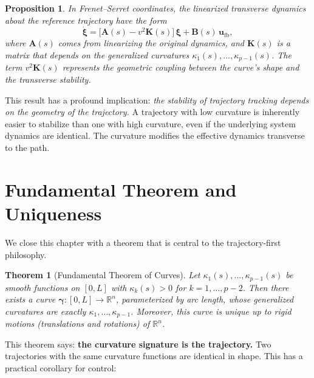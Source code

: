 \documentclass[12pt, openany]{book}
\theoremstyle{plain}
\newtheorem{proposition}{Proposition}[chapter]
\newtheorem{theorem}{Theorem}[chapter]
\newcommand{\control}{\bm{u}}
\newcommand{\traj}{\bm{\gamma}}
\newcommand{\Reals}{\mathbb{R}}
\begin{document}
\begin{proposition}\label{prop:curv_coupling}
  In Frenet--Serret coordinates, the linearized transverse dynamics about the
  reference trajectory have the form
  \begin{equation}\label{eq:transverse_lin}
    \dot{\bm{\xi}} = \bigl[\bm{A}(s) - v^2 \bm{K}(s)\bigr]\, \bm{\xi}
    + \bm{B}(s)\, \control_{\text{fb}},
  \end{equation}
  where $\bm{A}(s)$ comes from linearizing the original dynamics, and
  $\bm{K}(s)$ is a matrix that depends on the generalized curvatures
  $\kappa_1(s), \ldots, \kappa_{p-1}(s)$. The term $v^2\bm{K}(s)$ represents
  the geometric coupling between the curve's shape and the transverse stability.
\end{proposition}

This result has a profound implication: \emph{the stability of trajectory
tracking depends on the geometry of the trajectory.} A trajectory with low
curvature is inherently easier to stabilize than one with high curvature,
even if the underlying system dynamics are identical. The curvature modifies
the effective dynamics transverse to the path.

\section{Fundamental Theorem and Uniqueness}

We close this chapter with a theorem that is central to the trajectory-first
philosophy.

\begin{theorem}[Fundamental Theorem of Curves]\label{thm:fundamental}
  Let $\kappa_1(s), \ldots, \kappa_{p-1}(s)$ be smooth functions on
  $[0, L]$ with $\kappa_k(s) > 0$ for $k = 1, \ldots, p-2$. Then there
  exists a curve $\traj: [0, L] \to \Reals^n$, parameterized by arc length,
  whose generalized curvatures are exactly $\kappa_1, \ldots, \kappa_{p-1}$.
  Moreover, this curve is unique up to rigid motions (translations and
  rotations) of $\Reals^n$.
\end{theorem}

This theorem says: \textbf{the curvature signature is the trajectory.} Two
trajectories with the same curvature functions are identical in shape. This has
a practical corollary for control:
\end{document}
